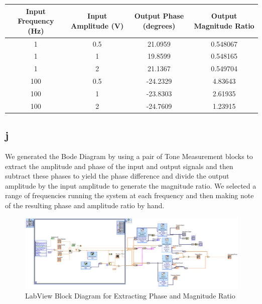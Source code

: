 \documentclass{article}
\theoremstyle{plain}
\theoremstyle{definition}
\theoremstyle{remark}
\begin{document}
\begin{table}[hbt]
\begin{center}
    \begin{tabular}{|c|c|c|c|}
        \hline
        Input Frequency (Hz) & Input Amplitude (V) & Output Phase (degrees) & Output Magnitude Ratio \\ \hline
        1                    & 0.5             & 21.0959                & 0.548067               \\ 
        1                    & 1               & 19.8599                & 0.548165               \\ 
        1                    & 2               & 21.1367                & 0.549704               \\ 
        100                  & 0.5             & -24.2329               & 4.83643                \\ 
        100                  & 1               & -23.8303               & 2.61935                \\ 
        100                  & 2               & -24.7609               & 1.23915                \\
        \hline
    \end{tabular}
\end{center}
\label{q1_it}
\end{table}

\subsection*{j}

We generated the Bode Diagram by using a pair of Tone Measurement blocks to extract the amplitude and phase of the input and output signals and then subtract these phases to yield the phase difference and divide the output amplitude by the input amplitude to generate the magnitude ratio.  We selected a range of frequencies running the system at each frequency and then making note of the resulting phase and amplitude ratio by hand.

\begin{figure}[h]
\begin{center}
\includegraphics[width = 17cm]{blockDiagram.png}
\caption{LabView Block Diagram for Extracting Phase and Magnitude Ratio}
\label{q1_j1}
\end{center}
\end{figure}
\end{document}
